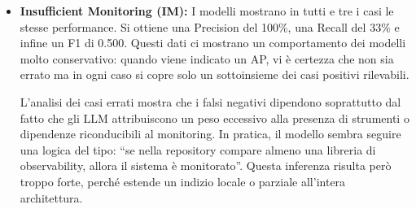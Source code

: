 \begin{itemize}
    Il problema è che i meccanismi di aggregazione non sono sempre individuabili all'interno della codebase e questo aspetto complica di conseguenza la detection dell'AP.

    Si precisa, infine, che è uno degli AP che ha beneficiato positivamente del cambio definizione rendendo la detection più accurata, riducendo falsi positivi e falsi negativi.

    \begin{tcolorbox}[
    title=\textbf{Indicatori tipici per rilevare il Local Logging},
    colback=blue!3!white,
    colframe=blue!55!black,
    coltitle=white,
    fonttitle=\bfseries,
    enhanced,
    breakable,
    arc=2mm,
    boxrule=0.8pt
]

I modelli tendono a segnalare l'anti-pattern quando trovano evidenze esplicite di log scritti localmente dai singoli microservizi:

\vspace{2mm}

\begin{itemize}[leftmargin=*]
    \item configurazioni con \textit{file appender} in \texttt{logback.xml}, \texttt{log4j.xml} o file simili;
    \item proprietà come \texttt{logging.file}, \texttt{logging.file.name}, \texttt{logging.path} o \texttt{logging.file.path};
    \item percorsi locali di scrittura dei log, ad esempio \texttt{/logs}, \texttt{/var/log}, \texttt{/opt/logs} o file \texttt{*.log};
    \item assenza di evidenze di raccolta o aggregazione centralizzata dei log.
\end{itemize}

\end{tcolorbox}

    \item \textbf{Insufficient Monitoring (IM):} I modelli mostrano in tutti e tre i casi le stesse performance. Si ottiene una Precision del 100\%, una Recall del 33\% e infine un F1 di 0.500. Questi dati ci mostrano un comportamento dei modelli molto conservativo: quando viene indicato un AP, vi è certezza che non sia errato ma in ogni caso si copre solo un sottoinsieme dei casi positivi rilevabili. 

    L'analisi dei casi errati mostra che i falsi negativi dipendono soprattutto dal fatto che gli LLM attribuiscono un peso eccessivo alla presenza di strumenti o dipendenze riconducibili al monitoring. In pratica, il modello sembra seguire una logica del tipo: ``se nella repository compare almeno una libreria di observability, allora il sistema è monitorato''. Questa inferenza risulta però troppo forte, perché estende un indizio locale o parziale all'intera architettura.
    

\end{itemize}
